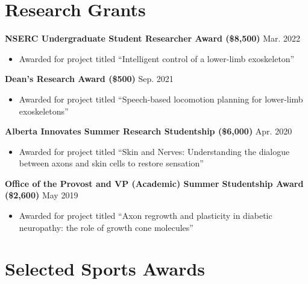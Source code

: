 \documentclass{article}
\begin{document}
\section*{\textcolor{my_colour}{Research Grants}}
\vspace{-.25em} \hrulefill \vspace{.25em}

\textbf{NSERC Undergraduate Student Researcher Award (\$8,500)} \hfill Mar. 2022
\begin{itemize}
    \item Awarded for project titled ``Intelligent control of a lower-limb exoskeleton''
\end{itemize} \vspace{1em}

\textbf{Dean's Research Award (\$500)} \hfill Sep. 2021
\begin{itemize}
    \item Awarded for project titled ``Speech-based locomotion planning for lower-limb exoskeletons''
\end{itemize} \vspace{1em}

\textbf{Alberta Innovates Summer Research Studentship (\$6,000)} \hfill Apr. 2020
\begin{itemize}
    \item Awarded for project titled ``Skin and Nerves: Understanding the dialogue between axons and skin cells to restore sensation''
\end{itemize} \vspace{1em}

\textbf{Office of the Provost and VP (Academic) Summer Studentship Award (\$2,600)} \hfill May 2019
\begin{itemize}
    \item Awarded for project titled ``Axon regrowth and plasticity in diabetic neuropathy: the role of growth cone molecules''
\end{itemize}


\section*{\textcolor{my_colour}{Selected Sports Awards} }
\vspace{-.25em} \hrulefill \vspace{.25em}
\end{document}
